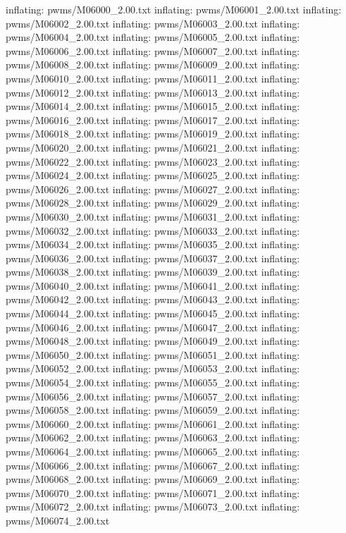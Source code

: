 \documentclass[letterpaper,10pt,english]{sphinxmanual}
\begin{document}
{\begin{sphinxVerbatim}[commandchars=\\\{\}]
  inflating: pwms/M06000\_2.00.txt
  inflating: pwms/M06001\_2.00.txt
  inflating: pwms/M06002\_2.00.txt
  inflating: pwms/M06003\_2.00.txt
  inflating: pwms/M06004\_2.00.txt
  inflating: pwms/M06005\_2.00.txt
  inflating: pwms/M06006\_2.00.txt
  inflating: pwms/M06007\_2.00.txt
  inflating: pwms/M06008\_2.00.txt
  inflating: pwms/M06009\_2.00.txt
  inflating: pwms/M06010\_2.00.txt
  inflating: pwms/M06011\_2.00.txt
  inflating: pwms/M06012\_2.00.txt
  inflating: pwms/M06013\_2.00.txt
  inflating: pwms/M06014\_2.00.txt
  inflating: pwms/M06015\_2.00.txt
  inflating: pwms/M06016\_2.00.txt
  inflating: pwms/M06017\_2.00.txt
  inflating: pwms/M06018\_2.00.txt
  inflating: pwms/M06019\_2.00.txt
  inflating: pwms/M06020\_2.00.txt
  inflating: pwms/M06021\_2.00.txt
  inflating: pwms/M06022\_2.00.txt
  inflating: pwms/M06023\_2.00.txt
  inflating: pwms/M06024\_2.00.txt
  inflating: pwms/M06025\_2.00.txt
  inflating: pwms/M06026\_2.00.txt
  inflating: pwms/M06027\_2.00.txt
  inflating: pwms/M06028\_2.00.txt
  inflating: pwms/M06029\_2.00.txt
  inflating: pwms/M06030\_2.00.txt
  inflating: pwms/M06031\_2.00.txt
  inflating: pwms/M06032\_2.00.txt
  inflating: pwms/M06033\_2.00.txt
  inflating: pwms/M06034\_2.00.txt
  inflating: pwms/M06035\_2.00.txt
  inflating: pwms/M06036\_2.00.txt
  inflating: pwms/M06037\_2.00.txt
  inflating: pwms/M06038\_2.00.txt
  inflating: pwms/M06039\_2.00.txt
  inflating: pwms/M06040\_2.00.txt
  inflating: pwms/M06041\_2.00.txt
  inflating: pwms/M06042\_2.00.txt
  inflating: pwms/M06043\_2.00.txt
  inflating: pwms/M06044\_2.00.txt
  inflating: pwms/M06045\_2.00.txt
  inflating: pwms/M06046\_2.00.txt
  inflating: pwms/M06047\_2.00.txt
  inflating: pwms/M06048\_2.00.txt
  inflating: pwms/M06049\_2.00.txt
  inflating: pwms/M06050\_2.00.txt
  inflating: pwms/M06051\_2.00.txt
  inflating: pwms/M06052\_2.00.txt
  inflating: pwms/M06053\_2.00.txt
  inflating: pwms/M06054\_2.00.txt
  inflating: pwms/M06055\_2.00.txt
  inflating: pwms/M06056\_2.00.txt
  inflating: pwms/M06057\_2.00.txt
  inflating: pwms/M06058\_2.00.txt
  inflating: pwms/M06059\_2.00.txt
  inflating: pwms/M06060\_2.00.txt
  inflating: pwms/M06061\_2.00.txt
  inflating: pwms/M06062\_2.00.txt
  inflating: pwms/M06063\_2.00.txt
  inflating: pwms/M06064\_2.00.txt
  inflating: pwms/M06065\_2.00.txt
  inflating: pwms/M06066\_2.00.txt
  inflating: pwms/M06067\_2.00.txt
  inflating: pwms/M06068\_2.00.txt
  inflating: pwms/M06069\_2.00.txt
  inflating: pwms/M06070\_2.00.txt
  inflating: pwms/M06071\_2.00.txt
  inflating: pwms/M06072\_2.00.txt
  inflating: pwms/M06073\_2.00.txt
  inflating: pwms/M06074\_2.00.txt

\end{sphinxVerbatim}}
\end{document}
